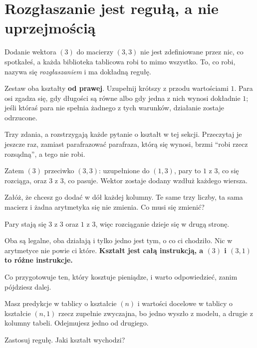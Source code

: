 \section{Rozgłaszanie jest regułą, a nie uprzejmością}
\label{sec:P07-broadcast}

\begin{fr}
Dodanie wektora $(3)$ do macierzy $(3, 3)$ nie jest zdefiniowane przez nic, co
spotkałeś, a każda biblioteka tablicowa robi to mimo wszystko. To, co robi,
nazywa się \emph{rozgłaszaniem} i ma dokładną regułę.

\begin{center}
Zestaw oba kształty \textbf{od prawej}. Uzupełnij krótszy z przodu wartościami
$1$. Para osi zgadza się, gdy długości są równe albo gdy jedna z nich wynosi
dokładnie $1$; jeśli któraś para nie spełnia żadnego z tych warunków, działanie
zostaje odrzucone.
\end{center}

Trzy zdania, a rozstrzygają każde pytanie o kształt w tej sekcji. Przeczytaj je
jeszcze raz, zamiast parafrazować \dash{} parafraza, którą się wynosi, brzmi
\enquote{robi rzecz rozsądną}, a tego nie robi.
\end{fr}


\begin{fr}
Zatem $(3)$ przeciwko $(3, 3)$: uzupełnione do $(1, 3)$, pary to $1$ z $3$, co
się rozciąga, oraz $3$ z $3$, co pasuje. Wektor zostaje dodany wzdłuż każdego
wiersza.

Załóż, że chcesz go dodać w dół każdej kolumny. Te same trzy liczby, ta sama
macierz i żadna arytmetyka się nie zmienia. Co musi się zmienić?
\dotline
\nextframe
\end{fr}

\begin{fr}
Pary stają się $3$ z $3$ oraz $1$ z $3$, więc rozciąganie dzieje się w drugą
stronę.

Oba są legalne, oba działają i tylko jedno jest tym, o co ci chodziło. Nic w
arytmetyce nie powie ci które. \textbf{Kształt jest całą instrukcją, a $(3)$ i
$(3, 1)$ to różne instrukcje.}

Co przygotowuje ten, który kosztuje pieniądze, i warto odpowiedzieć, zanim
pójdziesz dalej.

Masz predykcje w tablicy o kształcie $(n)$ i wartości docelowe w tablicy o
kształcie $(n, 1)$ \dash{} rzecz zupełnie zwyczajna, bo jedno wyszło z modelu,
a drugie z kolumny tabeli. Odejmujesz jedno od drugiego.

Zastosuj regułę. Jaki kształt wychodzi?
\dotline
\nextframe
\end{fr}

